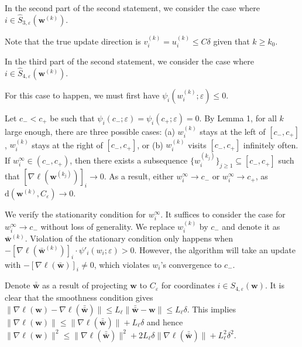 \documentclass[10pt,a4paper]{article}
\begin{document}
In the second part of the second statement, we consider the case where $i\in \hat{S}_{3,\varepsilon}(\mathbf{w}^{(k)})$. 

Note that the true update direction is $v_i^{(k)}=u_i^{(k)}\leq C\delta$ given that $k\geq k_0$.

In the third part of the second statement, we consider the case where $i\in \hat{S}_{4,\varepsilon}(\mathbf{w}^{(k)})$. 

For this case to happen, we must first have $\psi_i(w^{(k)}_i;\varepsilon)\leq0$.

Let $c_- < c_+$ be such that $\psi_i(c_-;\varepsilon)=\psi_i(c_+;\varepsilon)=0$. By Lemma 1, for all $k$ large enough, there are three possible cases: (a) $w_i^{(k)}$ stays at the left of $[c_-, c_+]$, $w_i^{(k)}$ stays at the right of $[c_-, c_+]$, or (b) $w_i^{(k)}$ visits $[c_-, c_+]$ infinitely often. If $w_i^\infty \in(c_-, c_+)$, then there exists a subsequence $\{w_i^{(k_j)}\}_{j\geq 1}\subseteq[c_-, c_+]$ such that $[\nabla \ell(\mathbf{w}^{(k_j)})]_i\to0$. As a result, either $w_i^\infty\to c_-$ or $w_i^\infty\to c_+$, as $\text{d}(\mathbf{w}^{(k)}, C_\varepsilon)\to 0$.

We verify the stationarity condition for $w_i^\infty$. It suffices to consider the case for $w_i^\infty\to c_-$ without loss of generality. We replace $w^{(k)}_i$ by $c_-$ and denote it as $\bar{\mathbf{w}}^{(k)}$. Violation of the stationary condition only happens when $-[\nabla\ell(\bar{\mathbf{w}}^{(k)})]_i\cdot \psi'_i(w_i;\varepsilon) > 0$. However, the algorithm will take an update with $-[\nabla\ell(\bar{\mathbf{w}})]_i\neq0$, which violates $w_i$'s convergence to $c_-$.

Denote $\bar{\bar{\mathbf{w}}}$ as a result of projecting $\mathbf{w}$ to $C_\varepsilon$ for coordinates $i\in S_{4, \varepsilon}(\mathbf{w})$. It is clear that the smoothness condition gives $\lVert \nabla\ell(\mathbf{w})-\nabla\ell(\bar{\bar{\mathbf{w}}})\rVert\leq L_\ell \|\bar{\bar{\mathbf{w}}}-\mathbf{w}\|\leq L_\ell\delta$. This implies $\lVert \nabla\ell(\mathbf{w})\rVert\leq \|\nabla\ell(\bar{\bar{\mathbf{w}}})\|+L_\ell\delta$ and hence $\lVert \nabla\ell(\mathbf{w})\rVert^2\leq \|\nabla\ell(\bar{\bar{\mathbf{w}}})\|^2+2L_\ell\delta\|\nabla\ell(\bar{\bar{\mathbf{w}}})\|+L_\ell^2\delta^2$.
\end{document}
